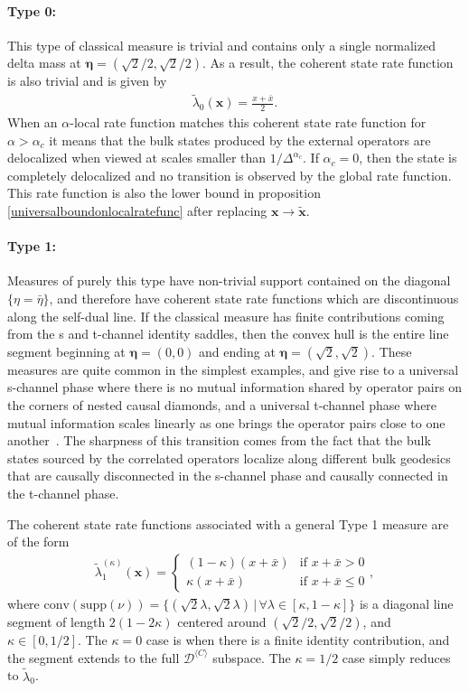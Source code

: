\documentclass[a4paper,11pt]{article}
\theoremstyle{plain}
\theoremstyle{definition}
\theoremstyle{remark}
\newcommand{\bs}[1]{\boldsymbol{#1}}
\newcommand{\ba}{\begin{equation} \begin{aligned}}
\newcommand{\ea}{\end{aligned} \end{equation}}
\newcommand{\De}{\Delta}
\begin{document}
\paragraph{Type 0:} This type of classical measure is trivial and contains only a single normalized delta mass at $\bs{\eta} = (\sqrt{2}/2, \sqrt{2}/2)$. As a result, the coherent state rate function is also trivial and is given by
\ba
\tilde{\lambda}_0(\bs{x}) = \frac{x+\bar{x}}{2}.
\ea
When an $\alpha$-local rate function matches this coherent state rate function for $\alpha > \alpha_c$ it means that the bulk states produced by the external operators are delocalized when viewed at scales smaller than $1/\De^{\alpha_c}$. If $\alpha_c = 0$, then the state is completely delocalized and no transition is observed by the global rate function. This rate function is also the lower bound in proposition \ref{universalboundonlocalratefunc} after replacing $\bs{x} \to \tilde{\bs{x}}$.

\paragraph{Type 1:} Measures of purely this type have non-trivial support contained on the diagonal $\{\eta = \bar{\eta} \}$, and therefore have coherent state rate functions which are discontinuous along the self-dual line. If the classical measure has finite contributions coming from the s and t-channel identity saddles, then the convex hull is the entire line segment beginning at $\bs{\eta} = (0,0)$ and ending at $\bs{\eta} = (\sqrt{2},\sqrt{2})$. These measures are quite common in the simplest examples, and give rise to a universal s-channel phase where there is no mutual information shared by operator pairs on the corners of nested causal diamonds, and a universal t-channel phase where mutual information scales linearly as one brings the operator pairs close to one another~\cite{Ceyhan:2025qrj}. The sharpness of this transition comes from the fact that the bulk states sourced by the correlated operators localize along different bulk geodesics that are causally disconnected in the s-channel phase and causally connected in the t-channel phase. 

The coherent state rate functions associated with a general Type 1 measure are of the form
\ba
\tilde{\lambda}^{(\kappa)}_1(\bs{x}) = \begin{cases}
    (1-\kappa)(x+\bar{x}) & \text{if } x + \bar{x} > 0 \\
    \kappa (x+\bar{x}) & \text{if } x+\bar{x} \leq 0 
\end{cases},
\ea
where $\mathrm{conv}(\mathrm{supp}(\nu)) = \{(\sqrt{2} \lambda, \sqrt{2} \lambda)\,|\,
 \forall \lambda\in[\kappa,1-\kappa] \}$ is a diagonal line segment of length $2 (1-2\kappa)$ centered around $(\sqrt{2}/2,\sqrt{2}/2)$, and $\kappa \in [0,1/2]$. The $\kappa = 0$ case is when there is a finite identity contribution, and the segment extends to the full $\mathcal{D}^{\langle C \rangle }$ subspace.  The $\kappa = 1/2$ case simply reduces to $\tilde{\lambda}_0$.
\end{document}
